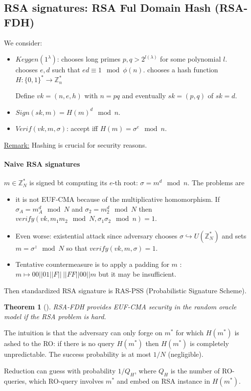 \documentclass{article}
\newtheorem{thm}{Theorem}[section]
\newcommand{\Thm}[3]{\begin{thm}[#1]\label{#2}#3\end{thm}}
\newcommand{\Rem}{\underline{Remark:} }
\newcommand{\Z}{\mathbb{Z}}
\newcommand{\bit}{\{0,1\}}
\begin{document}
\subsection{RSA signatures: RSA Ful Domain Hash (RSA-FDH)}
We consider:\begin{itemize}
\item $Keygen(1^\lambda)$:
\subitem chooses long primes $p,q>2^{l(\lambda)}$ for some polynomial $l$.
\subitem chooses $e,d$ such that $ed\equiv1\mod{\phi(n)}$.
\subitem chooses a hash function $H:\bit^*\rightarrow\Z_n^*$

Define $vk=(n,e,h)$ with $n=pq$ and eventually $sk=(p,q)$ of $sk=d$.
\item $Sign(sk,m)=H(m)^d\mod{n}$.
\item $Verif(vk,m,\sigma)$: accept iff $H(m)=\sigma^e\mod{n}$.
\end{itemize}

\Rem Hashing is crucial for security reasons.

\paragraph{Naive RSA signatures} $m\in\Z_N^*$ is signed bt computing its $e$-th root: $\sigma=m^d\mod{n}$. The problems are \begin{itemize}
\item it is not EUF-CMA because of the multiplicative homomorphism. If $\sigma_A=m_A^d\mod{N}$ and $\sigma_2=m_2^d\mod{N}$ then $verify(vk,m_1m_2\mod{N},\sigma_1\sigma_2\mod{n})=1$.
\item Even worse: existential attack since adversary chooses $\sigma\hookrightarrow U(\Z_N^*)$ and sets $m=\sigma^z\mod{N}$ so that $verify(vk,m,\sigma)=1$.

\item Tentative countermeasure is to apply a padding for $m$ : $m\mapsto 00||01||F||\ ||FF||00||m$ but it may be insufficient.
\end{itemize} 
Then standardized RSA signature is RAS-PSS (Probabilistic Signature Scheme).

\Thm{}{thm:RSAFDH-EUFCMA}{RSA-FDH provides EUF-CMA security in the random oracle model if the RSA problem is hard.}

The intuition is that the adversary can only forge on $m^*$ for which $H(m^*)$ is ashed to the RO: if there is no query $H(m^*)$ then $H(m^*)$ is completely unpredictable. The success probability is at most $1/N$ (negligible).

Reduction can guess with probability $1/Q_H$, where $Q_H$ is the number of RO-queries, which RO-query involves $m^*$ and embed on RSA instance in $H(m^*)$.
\end{document}
